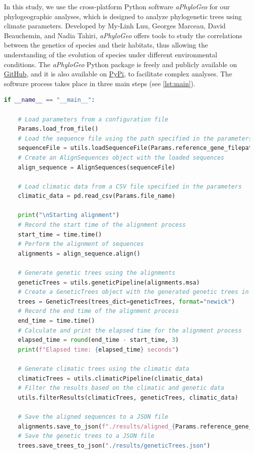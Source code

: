 In this study, we use the cross-platform Python software \textit{aPhyloGeo} for our phylogeographic analyses, which is designed to analyze phylogenetic trees using climate parameters. Developed by My-Linh Luu, Georges Marceau, David Beauchemin, and Nadia Tahiri, \textit{aPhyloGeo} offers tools to study the correlations between the genetics of species and their habitats, thus allowing the understanding of the evolution of species under different environmental conditions. The \textit{aPhyloGeo} Python package is freely and publicly available on \href{https://github.com/tahiri-lab/aPhyloGeo}{GitHub}, and it is also available on \href{https://pypi.org/project/aphylogeo/}{PyPi}, to facilitate complex analyses. The software process takes place in three main steps (see \autoref{lst:main}).

\begin{lstlisting}[label=lst:main,language=Python,caption=Main script for tutorial using the aPhyloGeo package.]
if __name__ == "__main__":

    # Load parameters from a configuration file
    Params.load_from_file()
    # Load the sequence file using the path specified in the parameters
    sequenceFile = utils.loadSequenceFile(Params.reference_gene_filepath)
    # Create an AlignSequences object with the loaded sequences
    align_sequence = AlignSequences(sequenceFile)

    # Load climatic data from a CSV file specified in the parameters
    climatic_data = pd.read_csv(Params.file_name)

    print("\nStarting alignment")
    # Record the start time of the alignment process
    start_time = time.time()
    # Perform the alignment of sequences
    alignments = align_sequence.align()

    # Generate genetic trees using the alignments
    geneticTrees = utils.geneticPipeline(alignments.msa)
    # Create a GeneticTrees object with the generated genetic trees in Newick format
    trees = GeneticTrees(trees_dict=geneticTrees, format="newick")
    # Record the end time of the alignment process
    end_time = time.time()
    # Calculate and print the elapsed time for the alignment process
    elapsed_time = round(end_time - start_time, 3)
    print(f"Elapsed time: {elapsed_time} seconds")

    # Generate climatic trees using the climatic data
    climaticTrees = utils.climaticPipeline(climatic_data)
    # Filter the results based on the climatic and genetic data
    utils.filterResults(climaticTrees, geneticTrees, climatic_data)

    # Save the aligned sequences to a JSON file
    alignments.save_to_json(f"./results/aligned_{Params.reference_gene_file}.json")
    # Save the genetic trees to a JSON file
    trees.save_trees_to_json("./results/geneticTrees.json")
\end{lstlisting}


